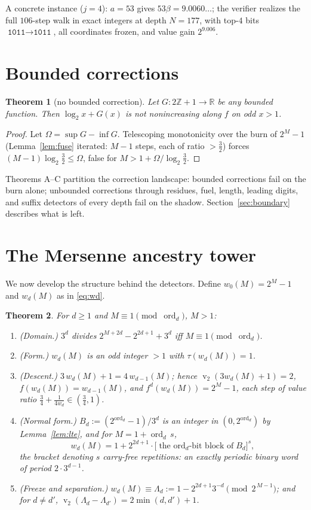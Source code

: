 \documentclass[11pt]{article}
\newtheorem{theorem}{Theorem}[section]
\theoremstyle{definition}
\theoremstyle{remark}
\newcommand{\Z}{\mathbb{Z}}
\newcommand{\R}{\mathbb{R}}
\newcommand{\ord}{\operatorname{ord}}
\DeclareMathOperator{\vv}{v}
\begin{document}
A concrete instance ($j=4$): $a=53$ gives $53\beta=9.0060\ldots$; the
verifier realizes the full $106$-step walk in exact integers at depth
$N=177$, with top-$4$ bits $\texttt{1011}\to\texttt{1011}$, all
coordinates frozen, and value gain $2^{9.006}$.

\section{Bounded corrections}\label{sec:bounded}

\begin{theorem}[no bounded correction]\label{thm:C}
Let $G:2\Z+1\to\R$ be any bounded function. Then $\log_2x+G(x)$ is not
nonincreasing along $f$ on odd $x>1$.
\end{theorem}

\begin{proof}
Let $\Omega=\sup G-\inf G$. Telescoping monotonicity over the burn of
$2^{M}-1$ (Lemma~\ref{lem:fuse} iterated: $M-1$ steps, each of ratio
$>\tfrac32$) forces $(M-1)\log_2\tfrac32\le\Omega$, false for
$M>1+\Omega/\log_2\tfrac32$.
\end{proof}

Theorems A--C partition the correction landscape: bounded corrections
fail on the burn alone; unbounded corrections through residues, fuel,
length, leading digits, and suffix detectors of every depth fail on
the shadow. Section~\ref{sec:boundary} describes what is left.

\section{The Mersenne ancestry tower}\label{sec:tower}

We now develop the structure behind the detectors. Define
$w_0(M)=2^{M}-1$ and $w_d(M)$ as in \eqref{eq:wd}.

\begin{theorem}\label{thm:D}
For $d\ge1$ and $M\equiv1\pmod{\ord_d}$, $M>1$:
\begin{enumerate}
\item[(a)] \textup{(Domain.)} $3^{d}$ divides
$2^{M+2d}-2^{2d+1}+3^{d}$ iff $M\equiv1\pmod{\ord_d}$.
\item[(b)] \textup{(Form.)} $w_d(M)$ is an odd integer $>1$ with
$\tau(w_d(M))=1$.
\item[(c)] \textup{(Descent.)} $3\,w_d(M)+1=4\,w_{d-1}(M)$; hence
$\vv_2(3w_d(M)+1)=2$, $f(w_d(M))=w_{d-1}(M)$, and
$f^{d}(w_d(M))=2^{M}-1$, each step of value ratio
$\tfrac34+\tfrac1{4w_d}\in(\tfrac34,1)$.
\item[(d)] \textup{(Normal form.)} $B_d:=(2^{\ord_d}-1)/3^{d}$ is an
integer in $(0,2^{\ord_d})$ by Lemma~\ref{lem:lte}, and for
$M=1+\ord_d\,s$,
\[
w_d(M)=1+2^{2d+1}\cdot\bigl[\text{the $\ord_d$-bit block of
}B_d\bigr]^{s},
\]
the bracket denoting $s$ carry-free repetitions: an exactly periodic
binary word of period $2\cdot3^{d-1}$.
\item[(e)] \textup{(Freeze and separation.)}
$w_d(M)\equiv\Lambda_d:=1-2^{2d+1}3^{-d}\pmod{2^{\,M-1}}$; and for
$d\ne d'$, $\vv_2(\Lambda_d-\Lambda_{d'})=2\min(d,d')+1$.
\end{enumerate}
\end{theorem}
\end{document}
